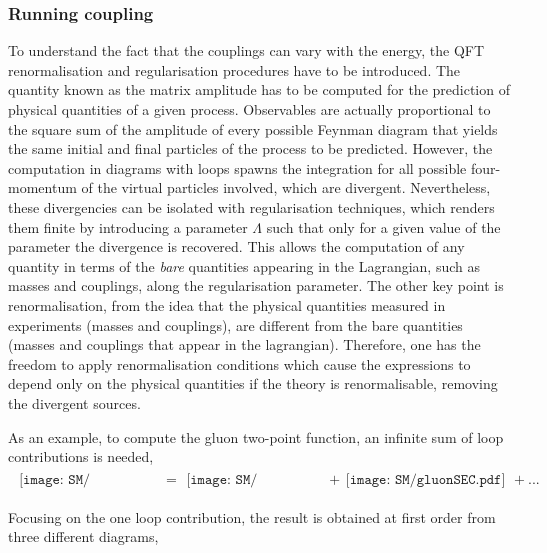 \subsubsection{Running coupling}

To understand the fact that the couplings can vary with the energy, the \acrshort{QFT} renormalisation and regularisation procedures have to be introduced. The quantity known as the matrix amplitude has to be computed for the prediction of physical quantities of a given process. Observables are actually proportional to the square sum of the amplitude of every possible Feynman diagram that yields the same initial and final particles of the process to be predicted. However, the computation in diagrams with loops spawns the integration for all possible four-momentum of the virtual particles involved, which are divergent. Nevertheless, these divergencies can be isolated with regularisation techniques, which renders them finite by introducing a parameter $\Lambda$ such that only for a given value of the parameter the divergence is recovered. This allows the computation of any quantity in terms of the \textit{bare} quantities appearing in the Lagrangian, such as masses and couplings, along the regularisation parameter. The other key point is renormalisation, from the idea that the physical quantities measured in experiments (masses and couplings), are different from the bare quantities (masses and couplings that appear in the lagrangian). Therefore, one has the freedom to apply renormalisation conditions which cause the expressions to depend only on the physical quantities if the theory is renormalisable, removing the divergent sources.

As an example, to compute the gluon two-point function, an infinite sum of loop contributions is needed,
\begin{align}
\begin{gathered}
    \texttt{[image: SM/gluonSEA.pdf]}
\end{gathered}&=\begin{gathered}\texttt{[image: SM/gluonSEB.pdf]}
\end{gathered}&+\begin{gathered}\texttt{[image: SM/gluonSEC.pdf]}
\end{gathered}+...
\end{align}

Focusing on the one loop contribution, the result is obtained at first order from three different diagrams,


